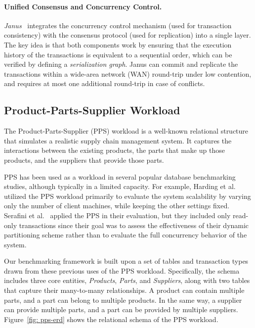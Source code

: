 \documentclass{article}
\begin{document}
\paragraph{Unified Consensus and Concurrency Control.}
\textit{Janus}~\cite{mu2016consolidating} integrates the concurrency control mechanism (used for transaction consistency) with the consensus protocol (used for replication) into a single layer. The key idea is that both components work by ensuring that the execution history of the transactions is equivalent to a sequential order, which can be verified by defining a \textit{serialization graph}. Janus can commit and replicate the transactions within a wide-area network (WAN) round-trip under low contention, and requires at most one additional round-trip in case of conflicts.

\subsection{Product-Parts-Supplier Workload}
\label{subsec: product-parts-supplier-workload}
The Product-Parts-Supplier (PPS) workload is a well-known relational structure that simulates a realistic supply chain management system. It captures the interactions between the existing products, the parts that make up those products, and the suppliers that provide those parts.

PPS has been used as a workload in several popular database benchmarking studies, although typically in a limited capacity. For example, Harding et al.~\cite{harding2017evaluation} utilized the PPS workload primarily to evaluate the system scalability by varying only the number of client machines, while keeping the other settings fixed. Serafini et al.~\cite{serafini2016clay} applied the PPS in their evaluation, but they included only read-only transactions since their goal was to assess the effectiveness of their dynamic partitioning scheme rather than to evaluate the full concurrency behavior of the system.

Our benchmarking framework is built upon a set of tables and transaction types drawn from these previous uses of the PPS workload. Specifically, the schema includes three core entities, \textit{Products}, \textit{Parts}, and \textit{Suppliers}, along with two tables that capture their many-to-many relationships. A product can contain multiple parts, and a part can belong to multiple products. In the same way, a supplier can provide multiple parts, and a part can be provided by multiple suppliers. Figure~\ref{fig: pps-erd} shows the relational schema of the PPS workload.
\end{document}
